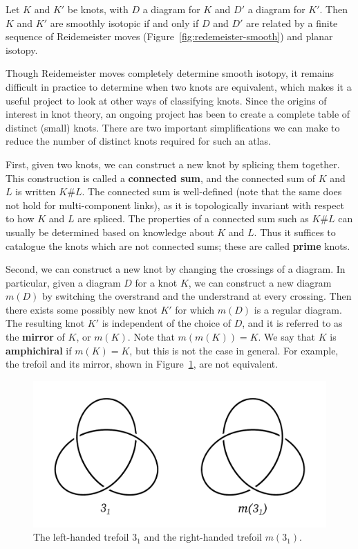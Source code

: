\begin{theorem}
    Let $K$ and $K'$ be knots, with $D$ a diagram for $K$ and $D'$ a diagram for $K'$. 
    Then $K$ and $K'$ are smoothly isotopic if and only if $D$ and $D'$ are related by a finite sequence of Reidemeister moves (Figure~\ref{fig:redemeister-smooth}) and planar isotopy.
\end{theorem}

Though Reidemeister moves completely determine smooth isotopy, it remains difficult in practice to determine when two knots are equivalent, which makes it a useful project to look at other ways of classifying knots. 
Since the origins of interest in knot theory, an ongoing project has been to create a complete table of distinct (small) knots. There are two important simplifications we can make to reduce the number of distinct knots required for such an atlas.

First, given two knots, we can construct a new knot by splicing them together. This construction is called a \textbf{connected sum}, and the connected sum of $K$ and $L$ is written $K \# L$. The connected sum is well-defined (note that the same does not hold for multi-component links), as it is topologically invariant with respect to how $K$ and $L$ are spliced.
The properties of a connected sum such as $K \# L$ can usually be determined based on knowledge about $K$ and $L$. Thus it suffices to catalogue the knots which are not connected sums; these are called \textbf{prime} knots.

Second, we can construct a new knot by changing the crossings of a diagram. In particular, given a diagram $D$ for a knot $K$, we can construct a new diagram $m(D)$ by switching the overstrand and the understrand at every crossing. Then there exists some possibly new knot $K'$ for which $m(D)$ is a regular diagram. The resulting knot $K'$ is independent of the choice of $D$, and it is referred to as the \textbf{mirror} of $K$, or $m(K)$. Note that $m(m(K)) = K$. We say that $K$ is \textbf{amphichiral} if $m(K) = K$, but this is not the case in general. For example, the trefoil and its mirror, shown in Figure~\ref{fig:mirror}, are not equivalent.

\begin{figure}[ht]
    \centering
    \includegraphics[width=0.5\linewidth]{images/mirror.pdf}
    \caption{The left-handed trefoil $3_1$ and the right-handed trefoil $m(3_1)$.}%
    \label{fig:mirror}
\end{figure}

